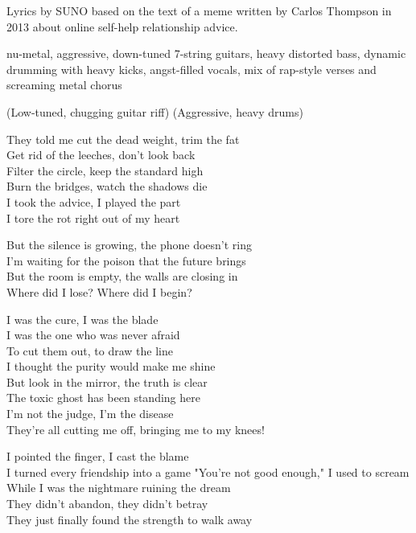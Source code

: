 
\begin{notes}
Lyrics by SUNO based on the text of a meme written by Carlos Thompson in 2013 about online self-help relationship advice.
\end{notes}
\begin{style}
nu-metal, aggressive, down-tuned 7-string guitars, heavy distorted bass, dynamic drumming with heavy kicks, angst-filled vocals, mix of rap-style verses and screaming metal chorus
\end{style}
\begin{lyrics}
(Low-tuned, chugging guitar riff)
(Aggressive, heavy drums)

They told me cut the dead weight, trim the fat\\
Get rid of the leeches, don’t look back\\
Filter the circle, keep the standard high\\
Burn the bridges, watch the shadows die\\
I took the advice, I played the part\\
I tore the rot right out of my heart

But the silence is growing, the phone doesn't ring\\
I’m waiting for the poison that the future brings\\
But the room is empty, the walls are closing in\\
Where did I lose? Where did I begin?

I was the cure, I was the blade\\
I was the one who was never afraid\\
To cut them out, to draw the line\\
I thought the purity would make me shine\\
But look in the mirror, the truth is clear\\
The toxic ghost has been standing here\\
I’m not the judge, I’m the disease\\
They’re all cutting me off, bringing me to my knees!

I pointed the finger, I cast the blame\\
I turned every friendship into a game
"You're not good enough," I used to scream\\
While I was the nightmare ruining the dream\\
They didn't abandon, they didn't betray\\
They just finally found the strength to walk away


\end{lyrics}
